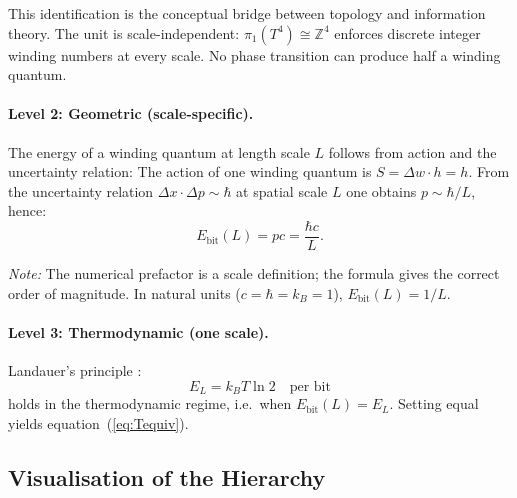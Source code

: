 This identification is the conceptual bridge between
topology and information theory.
The unit is scale-independent: \(\pi_1(T^4) \cong \mathbb{Z}^4\)
enforces discrete integer winding numbers at every scale.
No phase transition can produce half a winding quantum.

\paragraph{Level 2: Geometric (scale-specific).}

The energy of a winding quantum at length scale \(L\) follows
from action and the uncertainty relation:
The action of one winding quantum is \(S = \Delta w \cdot h = h\).
From the uncertainty relation \(\Delta x \cdot \Delta p \sim \hbar\)
at spatial scale \(L\) one obtains \(p \sim \hbar/L\), hence:
\begin{equation}
  E_\text{bit}(L) = pc = \frac{\hbar c}{L}.
  \label{eq:Ebit}
\end{equation}

\textit{Note:} The numerical prefactor is a scale definition;
the formula gives the correct order of magnitude.
In natural units (\(c = \hbar = k_B = 1\)), \(E_\text{bit}(L) = 1/L\).

\paragraph{Level 3: Thermodynamic (one scale).}

Landauer's principle \cite{Landauer1961}:
\begin{equation}
  E_L = k_B T \ln 2 \quad \text{per bit}
  \label{eq:Landauer}
\end{equation}
holds in the thermodynamic regime, i.e.\ when
\(E_\text{bit}(L) = E_L\).
Setting equal yields equation~(\ref{eq:Tequiv}).

\subsection{Visualisation of the Hierarchy}

\begin{center}
\renewcommand{\arraystretch}{1.6}
\end{center}

